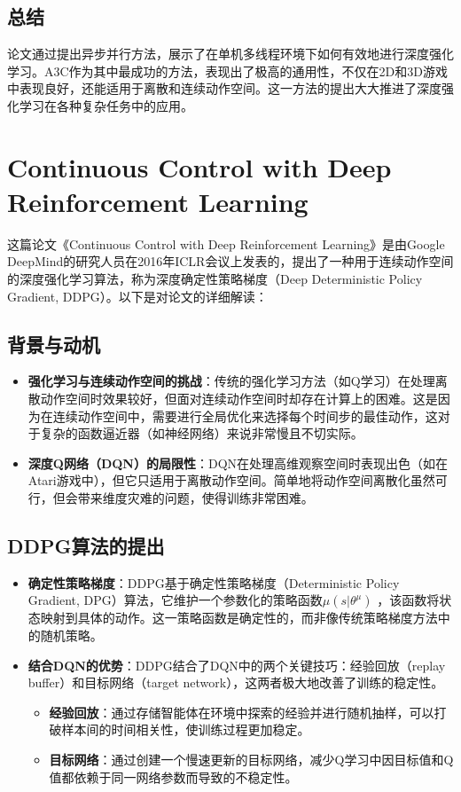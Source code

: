 \documentclass[twocolumn, 10pt]{article} %
\begin{document}
\subsection{总结}
论文通过提出异步并行方法，展示了在单机多线程环境下如何有效地进行深度强化学习。A3C作为其中最成功的方法，表现出了极高的通用性，不仅在2D和3D游戏中表现良好，还能适用于离散和连续动作空间。这一方法的提出大大推进了深度强化学习在各种复杂任务中的应用。


\section{Continuous Control with Deep Reinforcement Learning}
这篇论文《Continuous Control with Deep Reinforcement Learning》是由Google DeepMind的研究人员在2016年ICLR会议上发表的，提出了一种用于连续动作空间的深度强化学习算法，称为深度确定性策略梯度（Deep Deterministic Policy Gradient, DDPG）。以下是对论文的详细解读：

\subsection{背景与动机}
\begin{itemize}
    \item \textbf{强化学习与连续动作空间的挑战}：传统的强化学习方法（如Q学习）在处理离散动作空间时效果较好，但面对连续动作空间时却存在计算上的困难。这是因为在连续动作空间中，需要进行全局优化来选择每个时间步的最佳动作，这对于复杂的函数逼近器（如神经网络）来说非常慢且不切实际。
\end{itemize}
\begin{itemize}
    \item \textbf{深度Q网络（DQN）的局限性}：DQN在处理高维观察空间时表现出色（如在Atari游戏中），但它只适用于离散动作空间。简单地将动作空间离散化虽然可行，但会带来维度灾难的问题，使得训练非常困难。
\end{itemize}


\subsection{DDPG算法的提出}
\begin{itemize}
    \item \textbf{确定性策略梯度}：DDPG基于确定性策略梯度（Deterministic Policy Gradient, DPG）算法，它维护一个参数化的策略函数$\mu  \left( s|\theta^{\mu} \right)$
，该函数将状态映射到具体的动作。这一策略函数是确定性的，而非像传统策略梯度方法中的随机策略。
\end{itemize}
\begin{itemize}
    \item \textbf{结合DQN的优势}：DDPG结合了DQN中的两个关键技巧：经验回放（replay buffer）和目标网络（target network），这两者极大地改善了训练的稳定性。
\begin{itemize}
    \item \textbf{经验回放}：通过存储智能体在环境中探索的经验并进行随机抽样，可以打破样本间的时间相关性，使训练过程更加稳定。
    \item \textbf{目标网络}：通过创建一个慢速更新的目标网络，减少Q学习中因目标值和Q值都依赖于同一网络参数而导致的不稳定性。
\end{itemize}
\end{itemize}
\end{document}
